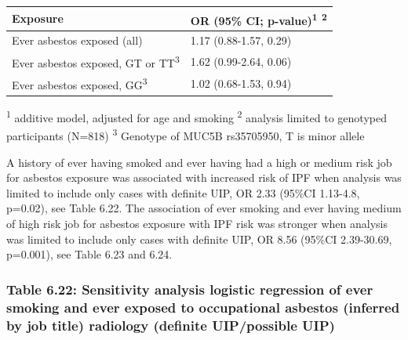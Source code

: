 \begin{longtable}[]{@{}ll@{}}
\toprule
Exposure & OR (95\% CI; p-value)\textsuperscript{1}
\textsuperscript{2}\tabularnewline
\midrule
\endhead
Ever asbestos exposed (all) & 1.17 (0.88-1.57, 0.29)\tabularnewline
Ever asbestos exposed, GT or TT\textsuperscript{3} & 1.62 (0.99-2.64,
0.06)\tabularnewline
Ever asbestos exposed, GG\textsuperscript{3} & 1.02 (0.68-1.53,
0.94)\tabularnewline
\bottomrule
\end{longtable}

\textsuperscript{1} additive model, adjusted for age and smoking
\textsuperscript{2} analysis limited to genotyped participants (N=818)
\textsuperscript{3} Genotype of MUC5B rs35705950, T is minor allele

A history of ever having smoked and ever having had a high or medium
risk job for asbestos exposure was associated with increased risk of IPF
when analysis was limited to include only cases with definite UIP, OR
2.33 (95\%CI 1.13-4.8, p=0.02), see Table 6.22. The association of ever
smoking and ever having medium of high risk job for asbestos exposure
with IPF risk was stronger when analysis was limited to include only
cases with definite UIP, OR 8.56 (95\%CI 2.39-30.69, p=0.001), see Table
6.23 and 6.24.

\newpage

\hypertarget{table-6.22-sensitivity-analysis-logistic-regression-of-ever-smoking-and-ever-exposed-to-occupational-asbestos-inferred-by-job-title-radiology-definite-uippossible-uip}{%
\subsubsection{Table 6.22: Sensitivity analysis logistic regression of
ever smoking and ever exposed to occupational asbestos (inferred by job
title) radiology (definite UIP/possible
UIP)}\label{table-6.22-sensitivity-analysis-logistic-regression-of-ever-smoking-and-ever-exposed-to-occupational-asbestos-inferred-by-job-title-radiology-definite-uippossible-uip}}


